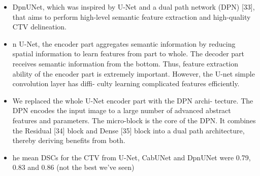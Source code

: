 \documentclass[11pt]{article}
\begin{document}
\begin{itemize}
    \item DpnUNet,
    which was inspired by U-Net and a dual path network (DPN) [33],
    that aims to perform high-level semantic feature extraction and
    high-quality CTV delineation.
    \item n U-Net, the encoder part aggregates semantic information by
    reducing spatial information to learn features from part to whole.
    The decoder part receives semantic information from the bottom.
    Thus, feature extraction ability of the encoder part is extremely
    important. However, the U-net simple convolution layer has diffi-
    culty learning complicated features efficiently.
    \item We replaced the whole U-Net encoder part with the DPN archi-
    tecture. The DPN encodes the input image to a large number of
    advanced abstract features and parameters. The micro-block is
    the core of the DPN. It combines the Residual [34] block and Dense
    [35] block into a dual path architecture, thereby deriving benefits
    from both.
    \item he mean DSCs for the CTV from U-Net, CabUNet and
    DpnUNet were 0.79, 0.83 and 0.86 (not the best we've seen)
\end{itemize}

\printbibliography
\end{document}
